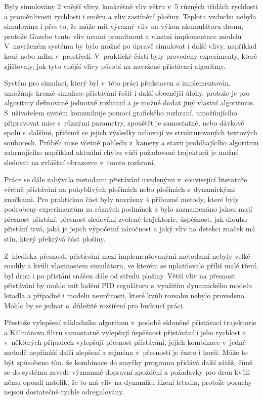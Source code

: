 Byly simulovány 2 vnější vlivy, konkrétně vliv větru v~5 různých třídách rychlosti a proměnlivosti rychlosti i směru a vliv zastínění plošiny. Teplota vzduchu nebyla simulována i přes to, že může mít výrazný vliv na výkon akumulátoru dronu, protože Gazebo tento vliv neumí promítnout a vlastní implementace modelu V~navrženém systému by bylo možné po úpravě simulovat i další vlivy, například kouř nebo mlhu v~prostředí. V~praktické části byly provedeny experimenty, které zjišťovaly, jak tyto vnější vlivy působí na navržené přistávací algoritmy.

Systém pro simulaci, který byl v~této práci představen a implementován, umožňuje kromě simulace přistávání řešit i další obecnější úlohy, protože je pro algoritmy definované jednotné rozhraní a je možné dodat jiný vlastní algoritmus. S~uživatelem systém komunikuje pomocí grafického rozhraní, umožňujícího připravovat mise s~různými parametry, spouštět je samostatně, nebo dávkově spolu s~dalšími, přičemž se jejich výsledky uchovají ve strukturovaných textových souborech. Průběh mise včetně pohledu z~kamery a stavu probíhajícího algoritmu zahrnujícího například aktuální chybu vůči požadované trajektorii je možné sledovat na zvláštní obrazovce v~tomto rozhraní.

Práce se dále zabývala metodami přistávání uvedenými v~související literatuře včetně přistávání na pohyblivých plošinách nebo plošinách s~dynamickými značkami. Pro praktickou část byly navrženy 4 příbuzné metody, které byly podrobeny experimentům za různých podmínek a bylo zaznamenáno jakou mají přesnost přistání, přesnost sledování zvolené trajektorie, úspěšnost, jak dlouho přistání trvá, jaká je jejich výpočetní náročnost a jaký vliv na detekci značek má stín, který překrývá část plošiny.

Z~hlediska přesnosti přistávání mezi implementovanými metodami nebyly velké rozdíly a kvůli vlastnostem simulátoru, ve kterém se uplatňovalo příliš malé tření, byl dron i po přistání snášen dále od středu plošiny. Větší vliv na přesnost přistávání by mohlo mít ladění PID regulátoru s~využitím dynamického modelu letadla a případně i modelu neurčitosti, které kvůli rozsahu nebylo provedeno. Mohlo by se jednat o~důležité rozšíření pro budoucí práci.

Přestože vylepšení základního algoritmu v~podobě skloněné přistávací trajektorie a Kálmánova filtru samostatně vylepšují úspěšnost přistávání i jeho rychlost a v~některých případech vylepšují přesnost přistávání, jejich kombinace v~jedné metodě nepřináší další zlepšení a zejména v~přesnosti je často i horší. Může to být způsobeno tím, že kombinace do smyčky programu přidává další zátěž, čímž se do systému zavede významné dopravní zpoždění a požadavky pro dron kvůli němu opozdí natolik, že to má vliv na dynamiku řízení letadla, protože poruchy nejsou dostatečně rychle odregulovány.

